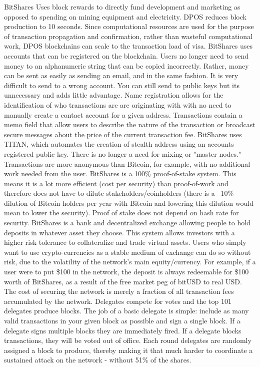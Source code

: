     BitShares Uses block rewards to directly fund development and marketing as opposed to spending on mining equipment and electricity.
    DPOS reduces block production to 10 seconds. Since computational resources are used for the purpose of transaction propagation and confirmation, rather than wasteful computational work, DPOS blockchains can scale to the transaction load of visa.
    BitShares uses accounts that can be registered on the blockchain. Users no longer need to send money to an alphanumeric string that can be copied incorrectly. Rather, money can be sent as easily as sending an email, and in the same fashion. It is very difficult to send to a wrong account. You can still send to public keys but its unnecessary and adds little advantage.
    Name registration allows for the identification of who transactions are are originating with with no need to manually create a contact account for a given address.
    Transactions contain a memo field that allow users to describe the nature of the transaction or broadcast secure messages about the price of the current transaction fee.
    BitShares uses TITAN, which automates the creation of stealth address using an accounts registered public key. There is no longer a need for mixing or "master nodes." Transactions are more anonymous than Bitcoin, for example, with no additional work needed from the user.
    BitShares is a 100\% proof-of-stake system. This means it is a lot more efficient (cost per security) than proof-of-work and therefore does not have to dilute stakeholders/coinholders (there is a ~10\% dilution of Bitcoin-holders per year with Bitcoin and lowering this dilution would mean to lower the security). Proof of stake does not depend on hash rate for security.
    BitShares is a bank and decentralized exchange allowing people to hold deposits in whatever asset they choose. This system allows investors with a higher risk tolerance to collateralize and trade virtual assets. Users who simply want to use crypto-currencies as a stable medium of exchange can do so without risk, due to the volatility of the network's main equity/currency. For example, if a user were to put \$100 in the network, the deposit is always redeemable for \$100 worth of BitShares, as a result of the free market peg of bitUSD to real USD.
    The cost of securing the network is merely a fraction of all transaction fees accumulated by the network.
    Delegates compete for votes and the top 101 delegates produce blocks. The job of a basic delegate is simple: include as many valid transactions in your given block as possible and sign a single block. If a delegate signs multiple blocks they are immediately fired. If a delegate blocks transactions, they will be voted out of office. Each round delegates are randomly assigned a block to produce, thereby making it that much harder to coordinate a sustained attack on the network - without 51\% of the shares.
